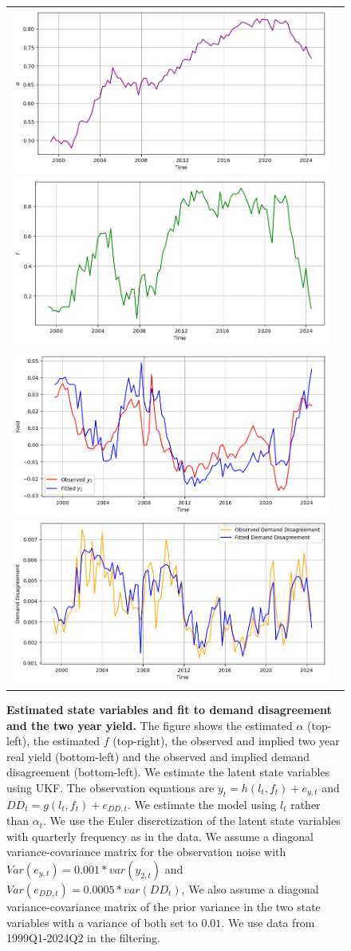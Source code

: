 \documentclass[preprint,11pt,authoryear]{elsarticle}
\theoremstyle{plain}
\begin{document}
\begin{figure}[htbp]
\centering
\begin{tabular}{cc}
\includegraphics[width=.45\textwidth]{figures/alphaFilter.png} 
\includegraphics[width=.45\textwidth]{figures/ffilter.png} \\ 
\includegraphics[width=.45\textwidth]{figures/yieldfilter.png} 
\includegraphics[width=.45\textwidth]{figures/DDfilter.png} \\ 
\end{tabular}
\caption{\textbf{Estimated state variables and fit to demand disagreement and the two year yield.} \footnotesize{The figure shows the estimated $\alpha$ (top-left), the estimated $f$ (top-right), the observed and implied two year real yield (bottom-left) and the observed and implied demand disagreement (bottom-left). We estimate the latent state variables using UKF. The observation equations are $y_t = h(l_t, f_t) + e_{y,t}$ and $DD_t = g(l_t,f_t) + e_{DD,t}$. We estimate the model using $l_t$ rather than $\alpha_t$.  We use the Euler discretization of the latent state variables with quarterly frequency as in the data. We assume a diagonal variance-covariance matrix for the observation noise with $Var(e_{y,t}) = 0.001 * var(y_{2,t})$ and $Var(e_{DD,t}) = 0.0005 * var(DD_t)$, We also assume a diagonal variance-covariance matrix of the prior variance in the two state variables with a variance of both set to $0.01$. We use data from 1999Q1-2024Q2 in the filtering.}}  \label{fig:UKFalphaandf}
\end{figure}
\end{document}
